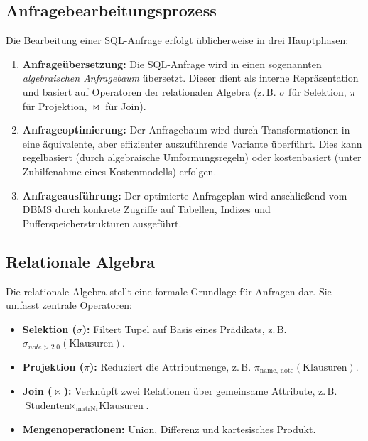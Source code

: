 \documentclass[12pt]{article}
\begin{document}
\subsection{Anfragebearbeitungsprozess}

Die Bearbeitung einer SQL-Anfrage erfolgt üblicherweise in drei Hauptphasen:

\begin{enumerate}
    \item \textbf{Anfrageübersetzung:} Die SQL-Anfrage wird in einen sogenannten \emph{algebraischen Anfragebaum} übersetzt. Dieser dient als interne Repräsentation und basiert auf Operatoren der relationalen Algebra (z.\,B. $\sigma$ für Selektion, $\pi$ für Projektion, $\bowtie$ für Join).
    
    \item \textbf{Anfrageoptimierung:} Der Anfragebaum wird durch Transformationen in eine äquivalente, aber effizienter auszuführende Variante überführt. Dies kann regelbasiert (durch algebraische Umformungsregeln) oder kostenbasiert (unter Zuhilfenahme eines Kostenmodells) erfolgen.
    
    \item \textbf{Anfrageausführung:} Der optimierte Anfrageplan wird anschließend vom DBMS durch konkrete Zugriffe auf Tabellen, Indizes und Pufferspeicherstrukturen ausgeführt.
\end{enumerate}

\subsection{Relationale Algebra}

Die relationale Algebra stellt eine formale Grundlage für Anfragen dar. Sie umfasst zentrale Operatoren:

\begin{itemize}
    \item \textbf{Selektion ($\sigma$):} Filtert Tupel auf Basis eines Prädikats, z.\,B. $\sigma_{note > 2.0}(\text{Klausuren})$.
    \item \textbf{Projektion ($\pi$):} Reduziert die Attributmenge, z.\,B. $\pi_{\text{name, note}}(\text{Klausuren})$.
    \item \textbf{Join ($\bowtie$):} Verknüpft zwei Relationen über gemeinsame Attribute, z.\,B. $\text{Studenten} \bowtie_{\text{matrNr}} \text{Klausuren}$.
    \item \textbf{Mengenoperationen:} Union, Differenz und kartesisches Produkt.
\end{itemize}
\end{document}
